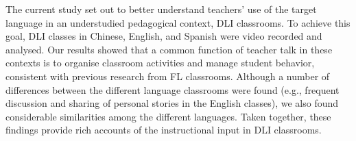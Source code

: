 \documentclass[output=paper,chinesefont]{langscibook}
\begin{document}
The current study set out to better understand teachers’ use of the target language in an understudied pedagogical context, DLI classrooms. To achieve this goal, DLI classes in Chinese, English, and Spanish were video recorded and analysed. Our results showed that a common function of teacher talk in these contexts is to organise classroom activities and manage student behavior, consistent with previous research from FL classrooms. Although a number of differences between the different language classrooms were found (e.g., frequent discussion and sharing of personal stories in the English classes), we also found considerable similarities among the different languages. Taken together, these findings provide rich accounts of the instructional input in DLI classrooms.

\printbibliography[heading=subbibliography,notkeyword=this]
\end{document}
